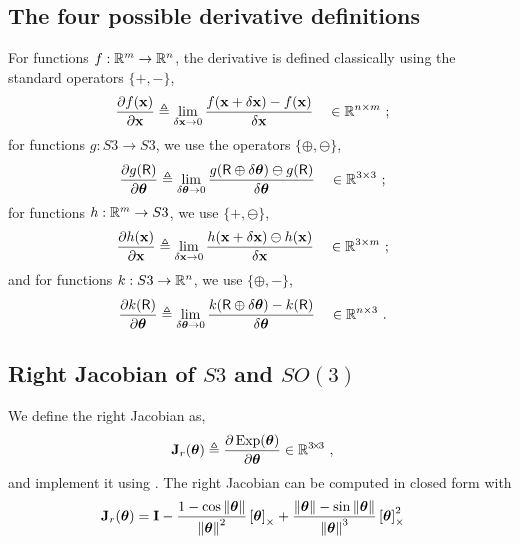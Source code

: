 \subsection{The four possible derivative definitions}

For functions $f:{\mathbb R}^m\to{\mathbb R}^n$, the derivative is defined classically using the standard operators $\{+,-\}$,
%
\begin{align}\label{equ:derivative_vector}
\frac{\partial f({\bf x})}{\partial{\bf x}} &\triangleq \lim_{\delta{\bf x}\to0}\frac{f({\bf x}+\delta{\bf x})-f({\bf x})}{\delta{\bf x}} &&\in {\mathbb R}^{n\times m} 
~;
\end{align}
%
for functions $g:S3\to S3$, we use the operators $\{\oplus,\ominus\}$,
%
\begin{align}\label{equ:derivative_SO3}
\frac{\partial g(\mathsf R)}{\partial{{\bm \theta}}} 
&\triangleq \lim_{\delta{{\bm \theta}}\to0}\frac{g(\mathsf R\oplus\delta{{\bm \theta}})\ominus g(\mathsf R)}{\delta{{\bm \theta}}}  && \in {\mathbb R}^{3\times 3}
~;
\end{align}
%
for functions $h:{\mathbb R}^m \to S3$, we use $\{+,\ominus\}$,
%
\begin{align}\label{equ:dif_RtoSO3}
\frac{\partial h({\bf x})}{\partial{\bf x}} &\triangleq \lim_{\delta{\bf x}\to0} \frac{ h({\bf x}+\delta{\bf x})\ominus h({\bf x})}{\delta{\bf x}} && \in {\mathbb R}^{3\times m} 
~;
\end{align}
%
and for functions $k:S3\to{\mathbb R}^n$, we use $\{\oplus,-\}$,
%
\begin{align}\label{equ:jacobian_SO3_Rn}
\frac{\partial k(\mathsf R)}{\partial{{\bm \theta}}} &\triangleq \lim_{\delta{{\bm \theta}}\to0} \frac{k(\mathsf R\oplus\delta{{\bm \theta}}) - k(\mathsf R)}{\delta{{\bm \theta}}} && \in {\mathbb R}^{n\times 3} 
~.
\end{align}


\subsection{Right Jacobian of $S3$ and $SO(3)$}

We define the right Jacobian as, 
%
\begin{align}\label{equ:Jr}
{\bf J}_r({{\bm \theta}}) &\triangleq \frac{\partial\operatorname*{Exp}({{\bm \theta}})}{\partial{{\bm \theta}}} 
\in{\mathbb R}^{3\!\times\!3}
~,
\end{align}
%
and implement it using .
The right Jacobian can be computed in closed form  \cite[pag.~40]{CHIRIKJIAN-12} with
%
\begin{align}
{\bf J}_r({{\bm \theta}}) &= {\bf I} - \frac{1-\cos{\left\|{{\bm \theta}}\right\|}}{{\left\|{{\bm \theta}}\right\|}^2}\left[{{\bm \theta}}\right]_\times + \frac{{\left\|{{\bm \theta}}\right\|}-\sin{\left\|{{\bm \theta}}\right\|}}{{\left\|{{\bm \theta}}\right\|}^3}\left[{{\bm \theta}}\right]_\times^2 
\end{align}




